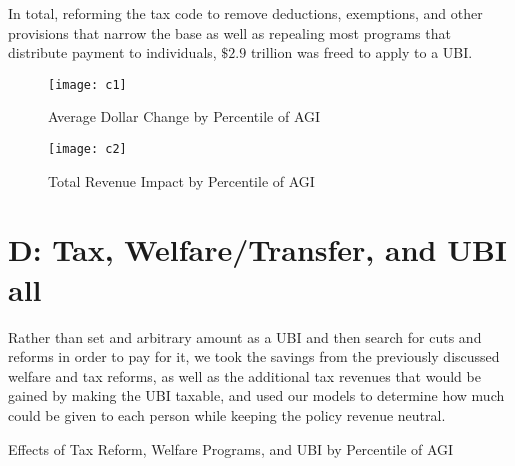 \documentclass{article}
\begin{document}
In total, reforming the tax code to remove deductions, exemptions, and other provisions that narrow the base as well as repealing most programs that distribute payment to individuals, $\$2.9$ trillion was freed to apply to a UBI.

\begin{figure}[H]
\centering
\caption{Average Dollar Change by Percentile of AGI}
\texttt{[image: c1]}
\end{figure}

\begin{figure}[H]
\centering
\caption{Total Revenue Impact by Percentile of AGI}
\texttt{[image: c2]}
\end{figure}



\section{D: Tax, Welfare/Transfer, and UBI all}

Rather than set and arbitrary amount as a UBI and then search for cuts and reforms in order to pay for it, we took the savings from the previously discussed welfare and tax reforms, as well as the additional tax revenues that would be gained by making the UBI taxable, and used our models to determine how much could be given to each person while keeping the policy revenue neutral.

\begin{table}[H]
\caption{Effects of Tax Reform, Welfare Programs, and UBI by Percentile of AGI}
\begin{center}
\begin{adjustbox}{max width=\textwidth}

\end{adjustbox}
\end{center}
\end{table}
\end{document}
